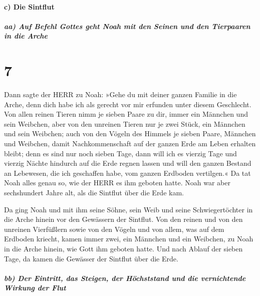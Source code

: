 \hypertarget{c-die-sintflut}{%
\paragraph{c) Die Sintflut}\label{c-die-sintflut}}

\hypertarget{aa-auf-befehl-gottes-geht-noah-mit-den-seinen-und-den-tierpaaren-in-die-arche}{%
\subparagraph{aa) Auf Befehl Gottes geht Noah mit den Seinen und den
Tierpaaren in die
Arche}\label{aa-auf-befehl-gottes-geht-noah-mit-den-seinen-und-den-tierpaaren-in-die-arche}}

\hypertarget{section-6}{%
\section{7}\label{section-6}}

 Dann sagte der HERR zu Noah: »Gehe du mit deiner ganzen
Familie in die Arche, denn dich habe ich als gerecht vor mir erfunden
unter diesem Geschlecht.  Von allen reinen Tieren nimm je
sieben Paare zu dir, immer ein Männchen und sein Weibchen, aber von den
unreinen Tieren nur je zwei Stück, ein Männchen und sein Weibchen;
 auch von den Vögeln des Himmels je sieben Paare, Männchen
und Weibchen, damit Nachkommenschaft auf der ganzen Erde am Leben
erhalten bleibt;  denn es sind nur noch sieben Tage, dann
will ich es vierzig Tage und vierzig Nächte hindurch auf die Erde regnen
lassen und will den ganzen Bestand an Lebewesen, die ich geschaffen
habe, vom ganzen Erdboden vertilgen.«  Da tat Noah alles
genau so, wie der HERR es ihm geboten hatte.  Noah war
aber sechshundert Jahre alt, als die Sintflut über die Erde kam.

 Da ging Noah und mit ihm seine Söhne, sein Weib und seine
Schwiegertöchter in die Arche hinein vor den Gewässern der Sintflut.
 Von den reinen und von den unreinen Vierfüßlern sowie von
den Vögeln und von allem, was auf dem Erdboden kriecht, 
kamen immer zwei, ein Männchen und ein Weibchen, zu Noah in die Arche
hinein, wie Gott ihm geboten hatte.  Und nach Ablauf der
sieben Tage, da kamen die Gewässer der Sintflut über die Erde.

\hypertarget{bb-der-eintritt-das-steigen-der-huxf6chststand-und-die-vernichtende-wirkung-der-flut}{%
\subparagraph{bb) Der Eintritt, das Steigen, der Höchststand und die
vernichtende Wirkung der
Flut}\label{bb-der-eintritt-das-steigen-der-huxf6chststand-und-die-vernichtende-wirkung-der-flut}}

